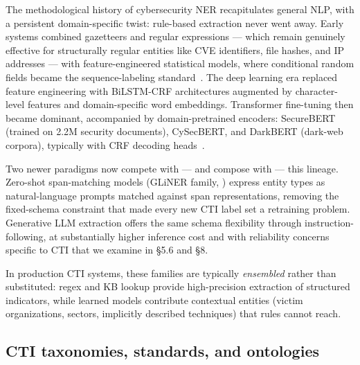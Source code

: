 \documentclass[11pt]{article}
\begin{document}
The methodological history of cybersecurity NER recapitulates general NLP, with a persistent domain-specific twist: rule-based extraction never went away. Early systems combined gazetteers and regular expressions — which remain genuinely effective for structurally regular entities like CVE identifiers, file hashes, and IP addresses — with feature-engineered statistical models, where conditional random fields became the sequence-labeling standard~\citep{echchammakhy2025cyberner}. The deep learning era replaced feature engineering with BiLSTM-CRF architectures augmented by character-level features and domain-specific word embeddings. Transformer fine-tuning then became dominant, accompanied by domain-pretrained encoders: SecureBERT (trained on 2.2M security documents), CySecBERT, and DarkBERT (dark-web corpora), typically with CRF decoding heads~\citep{echchammakhy2025cyberner}.

Two newer paradigms now compete with — and compose with — this lineage. Zero-shot span-matching models (GLiNER family, \citealp{zaratiana2023gliner}) express entity types as natural-language prompts matched against span representations, removing the fixed-schema constraint that made every new CTI label set a retraining problem. Generative LLM extraction offers the same schema flexibility through instruction-following, at substantially higher inference cost and with reliability concerns specific to CTI that we examine in §5.6 and §8.

In production CTI systems, these families are typically \emph{ensembled} rather than substituted: regex and KB lookup provide high-precision extraction of structured indicators, while learned models contribute contextual entities (victim organizations, sectors, implicitly described techniques) that rules cannot reach.

\subsection{CTI taxonomies, standards, and ontologies}
\end{document}
